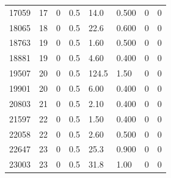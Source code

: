 \documentclass[preview]{standalone}
\begin{document}
{{{\begin{tabular}{L{1.2cm}C{1.2cm} C{0.3cm}C{0.5cm} C{1.4cm}C{1.4cm} C{1.4cm}C{1.4cm}}
  17059  &    17  & 0     & 0.5 &  14.0  & 0.500  & 0 &  0   \\ 
  18065  &    18  & 0     & 0.5 &  22.6  & 0.600  & 0 &  0   \\ 
  18763  &    19  & 0     & 0.5 &  1.60  & 0.500  & 0 &  0   \\ 
  18881  &    19  & 0     & 0.5 &  4.60  & 0.400  & 0 &  0   \\ 
  19507  &    20  & 0     & 0.5 &  124.5  & 1.50  & 0 &  0   \\ 
  19901  &    20  & 0     & 0.5 &  6.00  & 0.400  & 0 &  0   \\ 
  20803  &    21  & 0     & 0.5 &  2.10  & 0.400  & 0 &  0   \\ 
  21597  &    22  & 0     & 0.5 &  1.50  & 0.400  & 0 &  0   \\ 
  22058  &    22  & 0     & 0.5 &  2.60  & 0.500  & 0 &  0   \\ 
  22647  &    23  & 0     & 0.5 &  25.3  & 0.900  & 0 &  0   \\ 
  23003  &    23  & 0     & 0.5 &  31.8  & 1.00  & 0 &  0   \\ 
\hline 
\end{tabular} 

}}}
\end{document}
